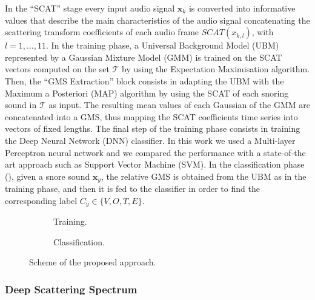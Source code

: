 In the ``SCAT'' stage every input audio signal $\mathbf{x}_{k}$ is converted into informative values that describe the main characteristics of the audio signal concatenating the scattering transform coefficients of each audio frame $SCAT({x}_{k,l})$, with $l=1,\dots,11$.
In the training phase, a Universal Background Model (UBM) represented by a Gaussian Mixture Model (GMM) is trained on the SCAT vectors computed on the set $\mathcal{T}$ by using the Expectation Maximisation algorithm. Then, the ``GMS Extraction'' block consists in adapting the UBM with the Maximum a Posteriori (MAP) algorithm  by using the SCAT of each snoring sound in $\mathcal{T}$ as input. The resulting mean values of each Gaussian of the GMM are concatenated into a GMS, thus mapping the SCAT coefficients time series into vectors of fixed lengths. %
The final step of the training phase consists in training the Deep Neural Network (DNN) classifier. In this work we used a Multi-layer Perceptron neural network and we compared the performance with a state-of-the art approach such as Support Vector Machine (SVM).
In the classification phase (), given a snore sound $\mathbf{x}_y$, the relative GMS is obtained from the UBM as in the training phase, and then it is fed to the classifier in order to find the corresponding label $C_y \in \{V, O, T, E\}$.



\begin{figure}[h]
	\centering
	\begin{subfigure}[b]{0.3\columnwidth}
		\def\svgwidth{\columnwidth}
		
		\caption{Training.} \label{sfig:training}
	\end{subfigure}
	\begin{subfigure}[b]{0.3\columnwidth}
		\def\svgwidth{\columnwidth}
		
		\caption{Classification.} \label{sfig:testing}
	\end{subfigure}
	\caption[VOTE Localization Algorithm]{Scheme of the proposed approach.}\label{fig:scheme}
\end{figure}


\subsubsection{Deep Scattering Spectrum}

